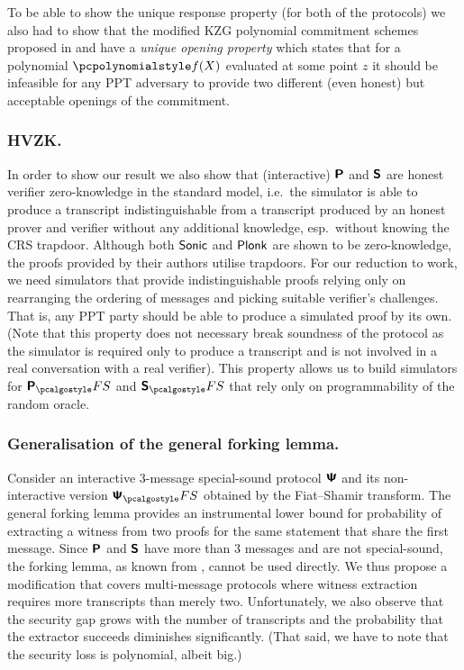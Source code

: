 \let\accentvec\vec \documentclass[runningheads]{llncs}
\begin{document}
To be able to show the unique response property (for both of the protocols) we
also had to show that the modified KZG polynomial commitment schemes
\cite{AC:KatZavGol10} proposed in \cite{EPRINT:GabWilCio19} and
\cite{CCS:MBKM19} have a \emph{unique opening property} which states that for a
polynomial $\p{f}(X)$ evaluated at some point $z$ it should be infeasible for
any PPT adversary to provide two different (even honest) but acceptable openings
of the commitment.

\subsubsection{HVZK.}%
In order to show our result we also show that (interactive) $\bm{\mathsf{P}}$ and
$\bm{\mathsf{S}}$ are honest verifier zero-knowledge in the standard model, i.e.~the
simulator is able to produce a transcript indistinguishable from a transcript
produced by an honest prover and verifier without any additional knowledge,
esp.~without knowing the CRS trapdoor. Although both ${\textnormal{\textsf{Sonic}}}$ and $\textnormal{\textsf{Plonk}}$ are
shown to be zero-knowledge, the proofs provided by their authors utilise
trapdoors. For our reduction to work, we need simulators that provide
indistinguishable proofs relying only on rearranging the ordering of messages
and picking suitable verifier's challenges. That is, any PPT party should be
able to produce a simulated proof by its own. (Note that this property does not
necessary break soundness of the protocol as the simulator is required only to
produce a transcript and is not involved in a real conversation with a real
verifier). This property allows us to build simulators for $\plonkprotfs$ and
$\sonicprotfs$ that rely only on programmability of the random oracle.

\subsubsection{Generalisation of the general forking lemma.}
Consider an interactive $3$-message special-sound protocol $\bm{\mathsf{\Psi}}$ and its
non-interactive version $\ps_\fs$ obtained by the Fiat--Shamir transform. The
general forking lemma provides an instrumental lower bound for probability of
extracting a witness from two proofs for the same statement that share the first
message. Since $\bm{\mathsf{P}}$ and $\bm{\mathsf{S}}$ have more than $3$ messages and are
not special-sound, the forking lemma, as known from \cite{CCS:BelNev06}, cannot
be used directly. We thus propose a modification that covers multi-message
protocols where witness extraction requires more transcripts than merely two.
Unfortunately, we also observe that the security gap grows with the number of
transcripts and the probability that the extractor succeeds diminishes
significantly. (That said, we have to note that the security loss is polynomial,
albeit big.)
\end{document}
